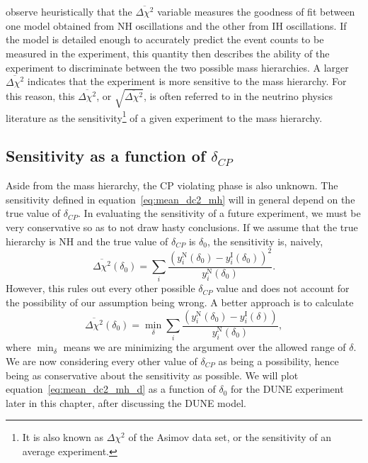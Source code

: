 observe heuristically that the $\overline{\Delta\chi^2}$ variable measures the goodness of
fit between one model obtained from NH oscillations and the other from IH
oscillations. If the model is detailed enough to accurately predict the event
counts to be measured in the experiment, this quantity then describes the
ability of the experiment to discriminate between the two possible mass
hierarchies. A larger $\overline{\Delta\chi^2}$ indicates that the experiment
is more sensitive to the mass hierarchy. For this reason,
this $\overline{\Delta\chi^2}$, or $\sqrt{\overline{\Delta\chi^2}}$, is often
referred to in the neutrino physics literature as the sensitivity\footnote{It is also known as
$\Delta\chi^2$ of the Asimov data set\cite{ciuffoli}, or the
sensitivity of an average experiment\cite{blennow}.} of a given
experiment to the mass hierarchy\cite{qian, martin-albo,
ballett}.

\subsection{Sensitivity as a function of $\delta_{CP}$}
Aside from the mass hierarchy, the CP violating phase is also 
unknown. The sensitivity defined in equation~\ref{eq:mean_dc2_mh} will in
general depend on the true value of $\delta_{CP}$. In evaluating the
sensitivity of a future experiment, we must be very conservative so
as to not draw hasty conclusions. 
If we assume that the true hierarchy is NH and the true value of $\delta_{CP}$ is
$\delta_0$, the sensitivity is, naively,
\begin{equation*}
	\overline{\Delta\chi^2}(\delta_0) = \sum_i \frac{(y^\text{N}_i(\delta_0) -
	y^\text{I}_i(\delta_0))^2}{y^\text{N}_i(\delta_0)}.
\end{equation*}
However, this rules out every other possible $\delta_{CP}$ value and does not
account for the possibility of our assumption being wrong. A better
approach is to calculate\cite{blennow}
\begin{equation}
	\overline{\Delta\chi^2}(\delta_0) = \min_\delta \sum_i \frac{(y^\text{N}_i
	(\delta_0) - y^\text{I}_i
	(\delta))}{y^\text{N}_i(\delta_0)},\label{eq:mean_dc2_mh_d}
\end{equation}
where $\min_\delta$ means we are minimizing the argument over the allowed range
of $\delta$.
We are now considering every other value of $\delta_{CP}$ as being
a possibility, hence being as conservative about the sensitivity as
possible. We will plot equation~\ref{eq:mean_dc2_mh_d} as a function of
$\delta_0$ for the DUNE experiment later in this chapter, after discussing the
DUNE model.


